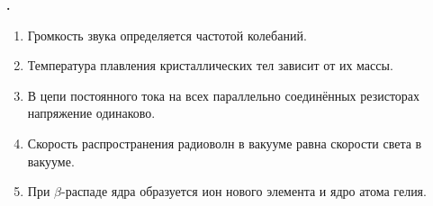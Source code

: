 \documentclass[12pt,a4paper]{article}
\newif\ifShowSolutions
\newcounter{banktask}
\newcommand{\BankTask}[3]{%
  \refstepcounter{banktask}%
  \Needspace{35mm}\par\medskip\noindent\begin{minipage}{\linewidth}%
  \noindent\textbf{\thebanktask.}\quad #2\par
  \ifShowSolutions
    #3\par
    \ifdefined\TutorEdition
      \ifcsname TutorSource#1\endcsname
        \smallskip{\small\csname TutorSource#1\endcsname\par}%
      \fi
    \fi
  \fi
  \end{minipage}\par\medskip
}
\begin{document}
\BankTask{024D10}{
\begin{enumerate}
\item Громкость звука определяется частотой колебаний.
\item Температура плавления кристаллических тел зависит от их массы.
\item В цепи постоянного тока на всех параллельно соединённых резисторах напряжение одинаково.
\item Скорость распространения радиоволн в вакууме равна скорости света в вакууме.
\item При \(\beta\)-распаде ядра образуется ион нового элемента и ядро атома гелия.
\end{enumerate}
}{
\smallskip\noindent\textbf{Решение от GPT}\par
1) Неверно: частота определяет высоту звука, а громкость связана прежде всего с интенсивностью звука. 2) Неверно: при одинаковом давлении температура плавления данного кристаллического вещества не зависит от массы. 3) Верно: параллельно соединённые резисторы подключены к одним и тем же двум узлам, поэтому \(U_1=U_2=\dots\). 4) Верно: радиоволны являются электромагнитными волнами и распространяются в вакууме со скоростью \(c=3\cdot10^8\,\text{м/с}\). 5) Неверно: при \(\beta\)-распаде испускается электрон или позитрон и соответствующее антинейтрино или нейтрино, а ядро гелия испускается при \(\alpha\)-распаде. Ответ: \(3,\,4\).
}
\end{document}
